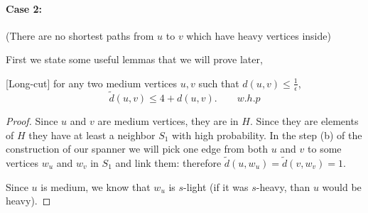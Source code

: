 \documentclass[11pt]{article}
\begin{document}
\begin{enumerate}
    \paragraph{Case 2:} (There are no shortest paths from $u$ to $v$ which have heavy vertices inside)

    First we state some useful lemmas that we will prove later,
    \begin{lemma}\label{l1}[Long-cut] for any two medium vertices $u,v$ such that $d(u,v) \leq \frac{1}{\epsilon}$,
        \begin{equation*}
            \tilde d(u,v) \leq 4 + d(u,v).\qquad w.h.p
        \end{equation*}
    \end{lemma}
    \begin{proof}
        Since $u$ and $v$ are medium vertices, they are in $H$. Since they are elements of $H$ they have at least a neighbor $S_1$ with high probability. In the step (b) of the construction of our spanner we will pick one edge from both $u$ and $v$ to some vertices $w_u$ and $w_v$ in $S_1$ and link them: therefore $\tilde d (u,w_u) = \tilde d(v,w_v) = 1$.  
        
        Since $u$ is medium, we know that $w_u$ is $s$-light (if it was $s$-heavy, than $u$ would be heavy). 
        

\end{proof}
\end{enumerate}
\end{document}
